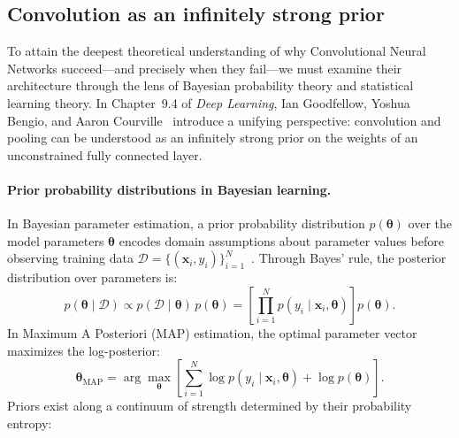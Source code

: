 \subsection{Convolution as an infinitely strong prior}
\label{sec:infinitely_strong_prior_bengio}

To attain the deepest theoretical understanding of why Convolutional Neural Networks succeed---and precisely when they fail---we must examine their architecture through the lens of Bayesian probability theory and statistical learning theory. In Chapter~9.4 of \textit{Deep Learning}, Ian Goodfellow, Yoshua Bengio, and Aaron Courville~\cite{goodfellow2016deep} introduce a unifying perspective: convolution and pooling can be understood as an infinitely strong prior on the weights of an unconstrained fully connected layer.

\paragraph{Prior probability distributions in Bayesian learning.}
In Bayesian parameter estimation, a prior probability distribution $p(\boldsymbol{\theta})$ over the model parameters $\boldsymbol{\theta}$ encodes domain assumptions about parameter values before observing training data $\mathcal{D} = \{(\mathbf{x}_i, y_i)\}_{i=1}^N$~\cite{bishop2024deep,goodfellow2016deep}. Through Bayes' rule, the posterior distribution over parameters is:
\begin{equation}
p(\boldsymbol{\theta} \mid \mathcal{D}) \propto p(\mathcal{D} \mid \boldsymbol{\theta}) \, p(\boldsymbol{\theta}) = \left[ \prod_{i=1}^N p(y_i \mid \mathbf{x}_i, \boldsymbol{\theta}) \right] p(\boldsymbol{\theta}).
\label{eq:bayesian_posterior_weights}
\end{equation}
In Maximum A Posteriori (MAP) estimation, the optimal parameter vector maximizes the log-posterior:
\begin{equation}
\boldsymbol{\theta}_{\text{MAP}} = \arg\max_{\boldsymbol{\theta}} \left[ \sum_{i=1}^N \log p(y_i \mid \mathbf{x}_i, \boldsymbol{\theta}) + \log p(\boldsymbol{\theta}) \right].
\label{eq:map_estimation_objective}
\end{equation}
Priors exist along a continuum of strength determined by their probability entropy:
